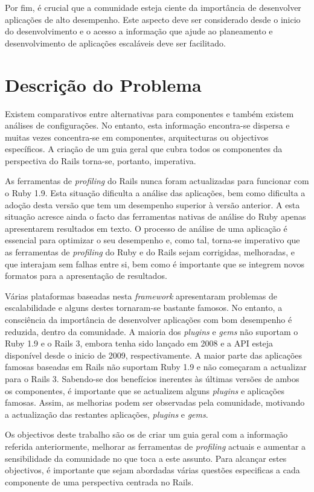 \documentclass[9pt,a4paper]{extarticle}
\begin{document}
\begin{multicols}{2}
Por fim, é crucial que a comunidade esteja ciente da importância de desenvolver aplicações de alto desempenho. Este aspecto deve ser considerado desde o inicio do desenvolvimento e o acesso a informação que ajude ao planeamento e desenvolvimento de aplicações escaláveis deve ser facilitado.


\section{Descrição do Problema}
Existem comparativos entre alternativas para componentes e também existem análises de configurações. No entanto, esta informação encontra-se dispersa e muitas vezes concentra-se em componentes, arquitecturas ou objectivos específicos. A criação de um guia geral que cubra todos os componentes da perspectiva do Rails torna-se, portanto, imperativa.

As ferramentas de \textit{profiling} do Rails nunca foram actualizadas para funcionar com o Ruby 1.9. Esta situação dificulta a análise das aplicações, bem como dificulta a adoção desta versão que tem um desempenho superior à versão anterior. A esta situação acresce ainda o facto das ferramentas nativas de análise do Ruby apenas apresentarem resultados em texto. O processo de análise de uma aplicação é essencial para optimizar o seu desempenho e, como tal, torna-se imperativo que as ferramentas de \textit{profiling} do Ruby e do Rails sejam corrigidas, melhoradas, e que interajam sem falhas entre si, bem como é importante que se integrem novos formatos para a apresentação de resultados.

Várias plataformas baseadas nesta \textit{framework} apresentaram problemas de escalabilidade e alguns destes tornaram-se bastante famosos. No entanto, a consciência da importância de desenvolver aplicações com bom desempenho é reduzida, dentro da comunidade. A maioria dos \textit{plugins} e \textit{gems} não suportam o Ruby 1.9 e o Rails 3, embora tenha sido lançado em 2008 e a API esteja disponível desde o inicio de 2009, respectivamente. A maior parte das aplicações famosas baseadas em Rails não suportam Ruby 1.9 e não começaram a actualizar para o Rails 3. Sabendo-se dos benefícios inerentes às últimas versões de ambos os componentes, é importante que se actualizem alguns \textit{plugins} e aplicações famosas. Assim, as melhorias podem ser observadas pela comunidade, motivando a actualização das restantes aplicações, \textit{plugins} e \textit{gems}.

Os objectivos deste trabalho são os de criar um guia geral com a informação referida anteriormente, melhorar as ferramentas de \textit{profiling} actuais e aumentar a sensibilidade da comunidade no que toca a este assunto. Para alcançar estes objectivos, é importante que sejam abordadas várias questões especificas a cada componente de uma perspectiva centrada no Rails.



\end{multicols}
\end{document}
